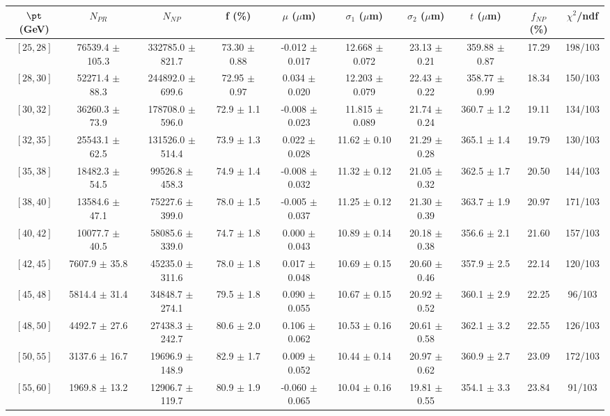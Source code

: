 \begin{tabular}{c||c|c|c|c|c|c|c||c|c}
$\pt$ (GeV) & $N_{PR}$ & $N_{NP}$ & f (\%) & $\mu$ ($\mu$m) & $\sigma_1$ ($\mu$m) & $\sigma_2$ ($\mu$m)  & $t$ ($\mu$m) & $f_{NP}$ (\%) & $\chi^2$/ndf \\
\hline
$[25, 28]$ & 76539.4 $\pm$ 105.3 & 332785.0 $\pm$ 821.7 & 73.30 $\pm$ 0.88 & -0.012 $\pm$ 0.017 & 12.668 $\pm$ 0.072 & 23.13 $\pm$ 0.21 & 359.88 $\pm$ 0.87 & 17.29 & 198/103\\
$[28, 30]$ & 52271.4 $\pm$ 88.3 & 244892.0 $\pm$ 699.6 & 72.95 $\pm$ 0.97 & 0.034 $\pm$ 0.020 & 12.203 $\pm$ 0.079 & 22.43 $\pm$ 0.22 & 358.77 $\pm$ 0.99 & 18.34 & 150/103\\
$[30, 32]$ & 36260.3 $\pm$ 73.9 & 178708.0 $\pm$ 596.0 & 72.9 $\pm$ 1.1 & -0.008 $\pm$ 0.023 & 11.815 $\pm$ 0.089 & 21.74 $\pm$ 0.24 & 360.7 $\pm$ 1.2 & 19.11 & 134/103\\
$[32, 35]$ & 25543.1 $\pm$ 62.5 & 131526.0 $\pm$ 514.4 & 73.9 $\pm$ 1.3 & 0.022 $\pm$ 0.028 & 11.62 $\pm$ 0.10 & 21.29 $\pm$ 0.28 & 365.1 $\pm$ 1.4 & 19.79 & 130/103\\
$[35, 38]$ & 18482.3 $\pm$ 54.5 & 99526.8 $\pm$ 458.3 & 74.9 $\pm$ 1.4 & -0.008 $\pm$ 0.032 & 11.32 $\pm$ 0.12 & 21.05 $\pm$ 0.32 & 362.5 $\pm$ 1.7 & 20.50 & 144/103\\
$[38, 40]$ & 13584.6 $\pm$ 47.1 & 75227.6 $\pm$ 399.0 & 78.0 $\pm$ 1.5 & -0.005 $\pm$ 0.037 & 11.25 $\pm$ 0.12 & 21.30 $\pm$ 0.39 & 363.7 $\pm$ 1.9 & 20.97 & 171/103\\
$[40, 42]$ & 10077.7 $\pm$ 40.5 & 58085.6 $\pm$ 339.0 & 74.7 $\pm$ 1.8 & 0.000 $\pm$ 0.043 & 10.89 $\pm$ 0.14 & 20.18 $\pm$ 0.38 & 356.6 $\pm$ 2.1 & 21.60 & 157/103\\
$[42, 45]$ & 7607.9 $\pm$ 35.8 & 45235.0 $\pm$ 311.6 & 78.0 $\pm$ 1.8 & 0.017 $\pm$ 0.048 & 10.69 $\pm$ 0.15 & 20.60 $\pm$ 0.46 & 357.9 $\pm$ 2.5 & 22.14 & 120/103\\
$[45, 48]$ & 5814.4 $\pm$ 31.4 & 34848.7 $\pm$ 274.1 & 79.5 $\pm$ 1.8 & 0.090 $\pm$ 0.055 & 10.67 $\pm$ 0.15 & 20.92 $\pm$ 0.52 & 360.1 $\pm$ 2.9 & 22.25 & 96/103\\
$[48, 50]$ & 4492.7 $\pm$ 27.6 & 27438.3 $\pm$ 242.7 & 80.6 $\pm$ 2.0 & 0.106 $\pm$ 0.062 & 10.53 $\pm$ 0.16 & 20.61 $\pm$ 0.58 & 362.1 $\pm$ 3.2 & 22.55 & 126/103\\
$[50, 55]$ & 3137.6 $\pm$ 16.7 & 19696.9 $\pm$ 148.9 & 82.9 $\pm$ 1.7 & 0.009 $\pm$ 0.052 & 10.44 $\pm$ 0.14 & 20.97 $\pm$ 0.62 & 360.9 $\pm$ 2.7 & 23.09 & 172/103\\
$[55, 60]$ & 1969.8 $\pm$ 13.2 & 12906.7 $\pm$ 119.7 & 80.9 $\pm$ 1.9 & -0.060 $\pm$ 0.065 & 10.04 $\pm$ 0.16 & 19.81 $\pm$ 0.55 & 354.1 $\pm$ 3.3 & 23.84 & 91/103\\

\end{tabular}

